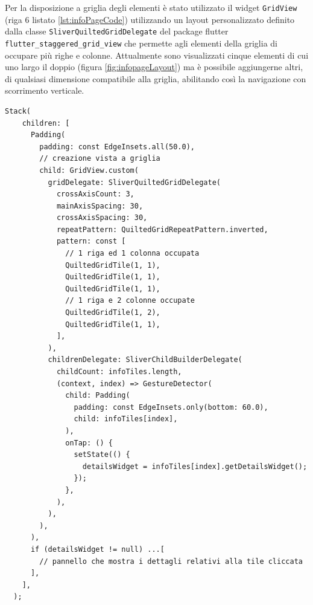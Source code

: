 Per la disposizione a griglia degli elementi è stato utilizzato il widget \texttt{GridView} (riga 6 listato \ref{lst:infoPageCode}) utilizzando un layout personalizzato definito dalla classe \texttt{SliverQuiltedGridDelegate} del package flutter \texttt{flutter\_staggered\_grid\_view} \cite{staggeredGridView} che permette agli elementi della griglia di occupare più righe e colonne.
Attualmente sono visualizzati cinque elementi di cui uno largo il doppio (figura \ref{fig:infopageLayout}) ma è possibile aggiungerne altri, di qualsiasi dimensione compatibile alla griglia, abilitando così la navigazione con scorrimento verticale.

\begin{lstlisting}[style=FlutterStyle, caption={Porzione di codice all'interno di \texttt{\_InfoPageState} per la creazione della pagina delle informazioni.}, label={lst:infoPageCode}]
  Stack(
    children: [
      Padding(
        padding: const EdgeInsets.all(50.0),
        // creazione vista a griglia
        child: GridView.custom(
          gridDelegate: SliverQuiltedGridDelegate(
            crossAxisCount: 3,
            mainAxisSpacing: 30,
            crossAxisSpacing: 30,
            repeatPattern: QuiltedGridRepeatPattern.inverted,
            pattern: const [
              // 1 riga ed 1 colonna occupata
              QuiltedGridTile(1, 1),  
              QuiltedGridTile(1, 1),
              QuiltedGridTile(1, 1),
              // 1 riga e 2 colonne occupate
              QuiltedGridTile(1, 2),
              QuiltedGridTile(1, 1),
            ],
          ),
          childrenDelegate: SliverChildBuilderDelegate(
            childCount: infoTiles.length,
            (context, index) => GestureDetector(
              child: Padding(
                padding: const EdgeInsets.only(bottom: 60.0),
                child: infoTiles[index],
              ),
              onTap: () {
                setState(() {
                  detailsWidget = infoTiles[index].getDetailsWidget();
                });
              },
            ),
          ),
        ),
      ),
      if (detailsWidget != null) ...[
        // pannello che mostra i dettagli relativi alla tile cliccata
      ],
    ],
  );
\end{lstlisting}
%
